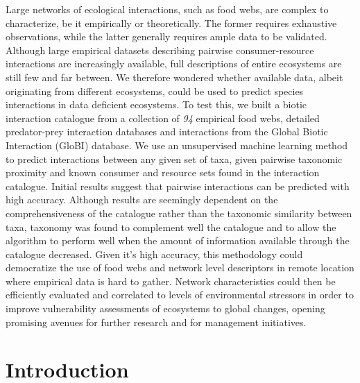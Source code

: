 \documentclass[letterpaper]{article}
\begin{document}
Large networks of ecological interactions, such as food webs, are complex to characterize, be it empirically or theoretically. The former requires exhaustive observations, while the latter generally requires ample data to be validated. Although large empirical datasets describing pairwise consumer-resource interactions are increasingly available, full descriptions of entire ecosystems are still few and far between. We therefore wondered whether available data, albeit originating from different ecosystems, could be used to predict species interactions in data deficient ecosystems. To test this, we built a biotic interaction catalogue from a collection of \textit{94} empirical food webs, detailed predator-prey interaction databases and interactions from the Global Biotic Interaction (GloBI) database. We use an unsupervised machine learning method to predict interactions between any given set of taxa, given pairwise taxonomic proximity and known consumer and resource sets found in the interaction catalogue. Initial results suggest that pairwise interactions can be predicted with high accuracy. Although results are seemingly dependent on the comprehensiveness of the catalogue rather than the taxonomic similarity between taxa, taxonomy was found to complement well the catalogue and to allow the algorithm to perform well when the amount of information available through the catalogue decreased. Given it’s high accuracy, this methodology could democratize the use of food webs and network level descriptors in remote location where empirical data is hard to gather. Network characteristics could then be efficiently evaluated and correlated to levels of environmental stressors in order to improve vulnerability assessments of ecosystems to global changes, opening promising avenues for further research and for management initiatives.

\section{Introduction}
\end{document}
